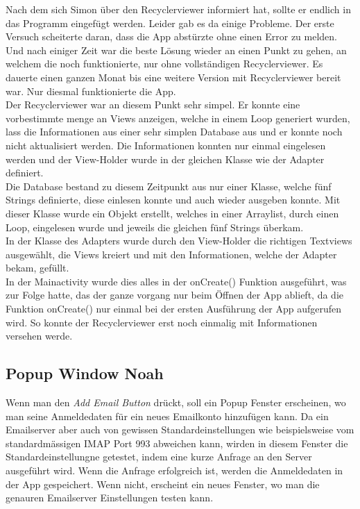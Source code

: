 \documentclass[a4paper,11pt]{article}
\begin{document}

Nach dem sich Simon über den Recyclerviewer informiert hat, sollte er endlich in das Programm eingefügt werden. Leider gab es da einige Probleme. Der erste Versuch scheiterte daran,
dass die App abstürzte ohne einen Error zu melden. Und nach einiger Zeit war die beste Lösung wieder an einen Punkt zu gehen, an welchem die noch funktionierte, nur ohne vollständigen 
Recyclerviewer. Es dauerte einen ganzen Monat bis eine weitere Version mit Recyclerviewer bereit war. Nur diesmal funktionierte die App. \\

Der Recyclerviewer war an diesem Punkt sehr simpel. Er konnte eine vorbestimmte menge an Views anzeigen, welche in einem Loop generiert wurden, lass die Informationen aus
einer sehr simplen Database aus und er konnte noch nicht aktualisiert werden. Die Informationen konnten nur einmal eingelesen werden und der View-Holder wurde in der gleichen Klasse wie 
der Adapter definiert. \\

Die Database bestand zu diesem Zeitpunkt aus nur einer Klasse, welche fünf Strings definierte, diese einlesen konnte und auch wieder ausgeben konnte. Mit dieser Klasse wurde
ein Objekt erstellt, welches in einer Arraylist, durch einen Loop, eingelesen wurde und jeweils die gleichen fünf Strings überkam. \\

In der Klasse des Adapters wurde durch den View-Holder die richtigen Textviews ausgewählt, die Views kreiert und mit den Informationen, welche der Adapter bekam, gefüllt. \\

In der Mainactivity wurde dies alles in der onCreate() Funktion ausgeführt, was zur Folge hatte, das der ganze vorgang nur beim Öffnen der App ablieft, da die Funktion onCreate()
nur einmal bei der ersten Ausführung der App aufgerufen wird. So konnte der Recyclerviewer erst noch einmalig mit Informationen versehen werde.


\subsection{Popup Window Noah }
Wenn man den \textit{Add Email Button} drückt, soll ein Popup Fenster erscheinen, wo man seine Anmeldedaten für ein neues Emailkonto hinzufügen kann. Da ein Emailserver aber auch von gewissen Standardeinstellungen wie beispielsweise vom standardmässigen IMAP Port 993 abweichen kann, wirden in diesem Fenster die Standardeinstellungne getestet, indem eine kurze Anfrage an den Server ausgeführt wird. Wenn die Anfrage erfolgreich ist, werden die Anmeldedaten in der App gespeichert. Wenn nicht, erscheint ein neues Fenster, wo man die genauren Emailserver Einstellungen testen kann.\\
\end{document}
